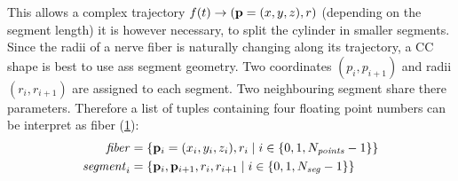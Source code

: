 This allows a complex trajectory $f(t) \rightarrow \left(\mathbf{p}=(x,y,z),r\right)$ (depending on the segment length) it is however necessary, to split the cylinder in smaller segments. Since the radii of a nerve fiber is naturally changing along its trajectory, a \ac{CC} shape is best to use ass segment geometry.
Two coordinates $(p_i, p_{i+1})$ and radii $(r_i, r_{i+1})$ are assigned to each segment. Two neighbouring segment share there parameters.
Therefore a list of tuples containing four floating point numbers can be interpret as fiber (\cref{fig:fiberReb}):
\begin{align}
\mathit{fiber} &= \left\{ \mathbf{p}_i=(x_i,y_i,z_i), r_i \mid i \in \{0,1,N_{\mathit{points}}-1\}\right\} \\
\mathit{segment}_i &= \left\{ \mathbf{p}_i, \mathbf{p}_{i+1}, r_i, r_{i+1} \mid i \in \{0,1,N_{\mathit{seg}}-1\} \right\}
\end{align}
% 
% 
\begin{figure}[!t]
    \def\tikzwidth{0.85\textwidth}
    \centering
	\caption[]{}
	\label{fig:fiberReb}
\end{figure}
% 
% 
% 
